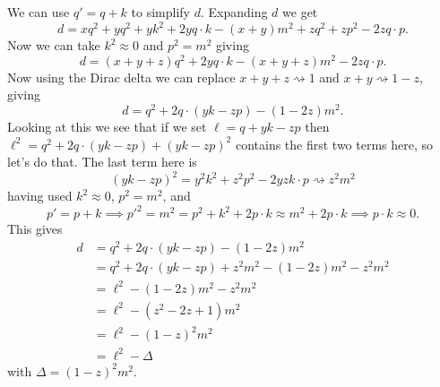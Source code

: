 \documentclass[fleqn]{NotesClass}
\begin{document}
    We can use \(q' = q + k\) to simplify \(d\).
    Expanding \(d\) we get
    \begin{equation}
        d = xq^2 + yq^2 + yk^2 + 2yq \cdot k - (x + y)m^2 + zq^2 + zp^2 - 2zq \cdot p.
    \end{equation}
    Now we can take \(k^2 \approx 0\) and \(p^2 = m^2\) giving
    \begin{equation}
        d = (x + y + z)q^2 + 2yq \cdot k - (x + y + z)m^2 - 2zq \cdot p.
    \end{equation}
    Now using the Dirac delta we can replace \(x + y + z \rightsquigarrow 1\) and \(x + y \rightsquigarrow 1 - z\), giving
    \begin{equation}
        d = q^2 + 2q \cdot (yk - zp) - (1 - 2z)m^2.
    \end{equation}
    Looking at this we see that if we set \(\ell = q + yk - zp\) then \(\ell^2 = q^2 + 2q\cdot (yk - zp) + (yk - zp)^2\) contains the first two terms here, so let's do that.
    The last term here is
    \begin{equation}
        (yk - zp)^2 = y^2k^2 + z^2p^2 - 2yz k \cdot p \rightsquigarrow z^2m^2
    \end{equation}
    having used \(k^2 \approx 0\), \(p^2 = m^2\), and
    \begin{equation}
        p' = p + k \implies p'^2 = m^2 = p^2 + k^2 + 2p \cdot k \approx m^2 + 2p\cdot k \implies p \cdot k \approx 0.
    \end{equation}
    This gives
    \begin{align}
        d &= q^2 + 2q \cdot (yk - zp) - (1 - 2z)m^2\\
        &= q^2 + 2q\cdot (yk - zp) + z^2m^2 - (1 - 2z)m^2 - z^2m^2\\
        &= \ell^2 - (1 - 2z)m^2 - z^2m^2\\
        &= \ell^2 - (z^2 - 2z + 1)m^2\\
        &= \ell^2 - (1 - z)^2m^2\\
        &= \ell^2 - \Delta
    \end{align}
    with \(\Delta = (1 - z)^2 m^2\).
    
\end{document}
